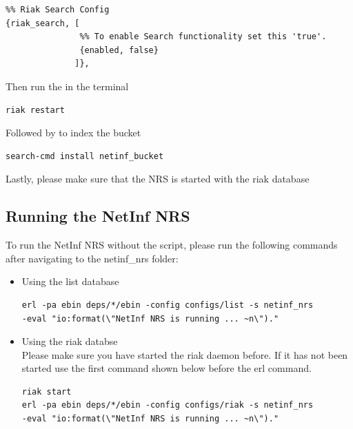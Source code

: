 \begin{verbatim}
%% Riak Search Config
{riak_search, [
               %% To enable Search functionality set this 'true'.
               {enabled, false}
              ]},
\end{verbatim}

Then run the in the terminal

\begin{verbatim}
riak restart
\end{verbatim}

Followed by to index the bucket

\begin{verbatim}
search-cmd install netinf_bucket
\end{verbatim}

Lastly, please make sure that the NRS is started with the riak database

\subsection{Running the NetInf NRS}

To run the NetInf NRS without the script, please run the following commands after navigating to the netinf\_nrs folder:

\begin{itemize}
\item Using the list database \\
\begin{verbatim}
erl -pa ebin deps/*/ebin -config configs/list -s netinf_nrs 
-eval "io:format(\"NetInf NRS is running ... ~n\")." 
\end{verbatim}

\item Using the riak databse \\
Please make sure you have started the riak daemon before. If it has not been started use the first command shown below before the erl command.
\begin{verbatim}
riak start
erl -pa ebin deps/*/ebin -config configs/riak -s netinf_nrs 
-eval "io:format(\"NetInf NRS is running ... ~n\")." 
\end{verbatim}
\end{itemize}





